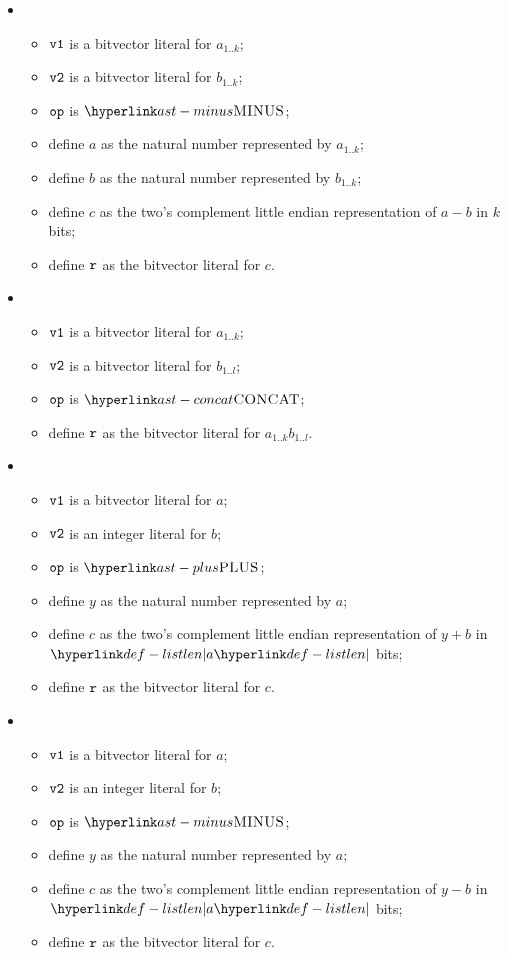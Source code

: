 \begin{itemize}
  \item {}
  \begin{itemize}
    \item $\texttt{v1}$ is a bitvector literal for $a_{1..k}$;
    \item $\texttt{v2}$ is a bitvector literal for $b_{1..k}$;
    \item $\texttt{op}$ is $\MINUS$;
    \item define $a$ as the natural number represented by $a_{1..k}$;
    \item define $b$ as the natural number represented by $b_{1..k}$;
    \item define $c$ as the two's complement little endian representation of $a-b$ in $k$ bits;
    \item define $\texttt{r}$ as the bitvector literal for $c$.
  \end{itemize}

  \item {}
  \begin{itemize}
    \item $\texttt{v1}$ is a bitvector literal for $a_{1..k}$;
    \item $\texttt{v2}$ is a bitvector literal for $b_{1..l}$;
    \item $\texttt{op}$ is $\CONCAT$;
    \item define $\texttt{r}$ as the bitvector literal for $a_{1..k}b_{1..l}$.
  \end{itemize}

  \item {}
  \begin{itemize}
    \item $\texttt{v1}$ is a bitvector literal for $a$;
    \item $\texttt{v2}$ is an integer literal for $b$;
    \item $\texttt{op}$ is $\PLUS$;
    \item define $y$ as the natural number represented by $a$;
    \item define $c$ as the two's complement little endian representation of $y+b$ in $\listlen{a}$ bits;
    \item define $\texttt{r}$ as the bitvector literal for $c$.
  \end{itemize}

  \item {}
  \begin{itemize}
    \item $\texttt{v1}$ is a bitvector literal for $a$;
    \item $\texttt{v2}$ is an integer literal for $b$;
    \item $\texttt{op}$ is $\MINUS$;
    \item define $y$ as the natural number represented by $a$;
    \item define $c$ as the two's complement little endian representation of $y-b$ in $\listlen{a}$ bits;
    \item define $\texttt{r}$ as the bitvector literal for $c$.
  \end{itemize}


\end{itemize}
